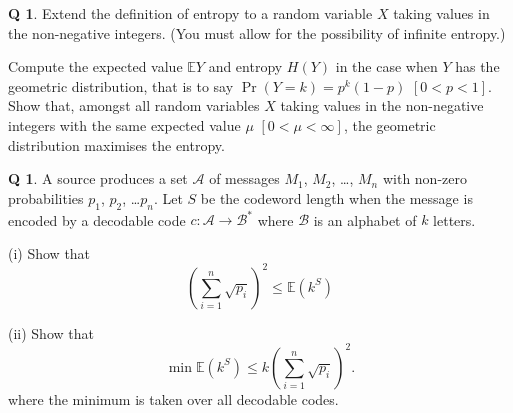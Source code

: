 \documentclass[12pt,a4paper]{article}
\theoremstyle{plain}
\theoremstyle{definition}
\newtheorem{question}[theorem]{Q}
\begin{document}
\begin{question}\label{C1.14} Extend the definition of entropy to
a random variable $X$ taking values in the non-negative
integers. (You must allow for the possibility
of infinite entropy.) 

Compute the expected value ${\mathbb E}Y$ and
entropy $H(Y)$ in the case when $Y$ has the geometric
distribution, that is to say 
$\Pr(Y=k)=p^{k}(1-p)$
$[0<p<1]$. Show that, amongst all random variables 
$X$ taking values in the non-negative
integers with the same expected value $\mu$ $[0<\mu<\infty]$,
the geometric distribution maximises the entropy.
\end{question}
\begin{question}\label{C1.15} A source produces a set ${\mathcal A}$
of messages 
$M_{1}$, $M_{2}$,
\dots, $M_{n}$ with non-zero probabilities $p_{1}$, $p_{2}$,
\dots $p_{n}$. Let $S$ be the codeword length when the message
is encoded by a decodable code $c:{\mathcal A}\rightarrow{\mathcal B}^{*}$ 
where ${\mathcal B}$ is an alphabet of $k$ letters.

(i) Show that
\[\left(\sum_{i=1}^{n}\sqrt{p_{i}}\right)^{2}
\leq {\mathbb E}(k^{S})\]

\noindent[Hint: Cauchy--Schwarz,
$p_{i}^{1/2}=p_{i}^{1/2}k^{s_{i}/2}k^{-s_{i}/2}$.]

(ii) Show that
\[\min{\mathbb E}(k^{S})\leq
k\left(\sum_{i=1}^{n}\sqrt{p_{i}}\right)^{2}.\]
where the minimum is taken over all decodable codes.

\noindent[Hint: Look for a code with codeword lengths
$s_{i}=\lceil -\log_{k} p_{i}^{1/2}/\lambda\rceil$ for
an appropriate $\lambda$.]
\end{question}
\newpage
\end{document}
